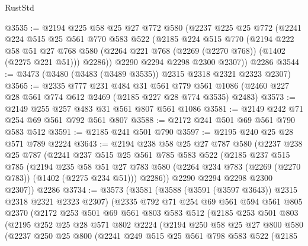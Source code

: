 \begin{lexlean}{RustStd}
\begin{coremodule}
@3535 := @2194
    @225
    @58
    @25
    @27
    @772
    @580
    (@2237
      @225
      @25
      @772
      (@2241
        @224
        @515
        @25
        @561
        @770
        @583
        @522
        (@2185
          @224
          @515
          @770
          (@2194
            @222
            @58
            @51
            @27
            @768
            @580
            (@2264 @221 @768 (@2269 (@2270 @768)) (@1402 (@2275 @221 @51)))
            @2286))
        @2290
        @2294
        @2298
        @2300
        @2307))
    @2286
@3544 := @3473 (@3480 (@3483 (@3489 @3535)) @2315 @2318 @2321 @2323 @2307)
@3565 := @2335
    @777
    @231
    @484
    @31
    @561
    @779
    @561
    @1086
    (@2460 @227 @28 @561 @774 @612 @2469 (@2185 @227 @28 @774 @3535) @2483)
@3573 := @2149 @255 @257 @483 @31 @561 @807 @561 @1086
@3581 := @2149 @242 @71 @254 @69 @561 @792 @561 @807
@3588 := @2172 @241 @501 @69 @561 @790 @583 @512
@3591 := @2185 @241 @501 @790
@3597 := @2195 @240 @25 @28 @571 @789 @2224
@3643 := @2194
    @238
    @58
    @25
    @27
    @787
    @580
    (@2237
      @238
      @25
      @787
      (@2241
        @237
        @515
        @25
        @561
        @785
        @583
        @522
        (@2185
          @237
          @515
          @785
          (@2194
            @235
            @58
            @51
            @27
            @783
            @580
            (@2264 @234 @783 (@2269 (@2270 @783)) (@1402 (@2275 @234 @51)))
            @2286))
        @2290
        @2294
        @2298
        @2300
        @2307))
    @2286
@3734 := @3573
    (@3581
      (@3588 (@3591 (@3597 @3643)) @2315 @2318 @2321 @2323 @2307)
      (@2335
        @792
        @71
        @254
        @69
        @561
        @594
        @561
        @805
        @2370
        (@2172
          @253
          @501
          @69
          @561
          @803
          @583
          @512
          (@2185
            @253
            @501
            @803
            (@2195
              @252
              @25
              @28
              @571
              @802
              @2224
              (@2194
                @250
                @58
                @25
                @27
                @800
                @580
                (@2237
                  @250
                  @25
                  @800
                  (@2241
                    @249
                    @515
                    @25
                    @561
                    @798
                    @583
                    @522
                    (@2185

\end{coremodule}
\end{lexlean}
